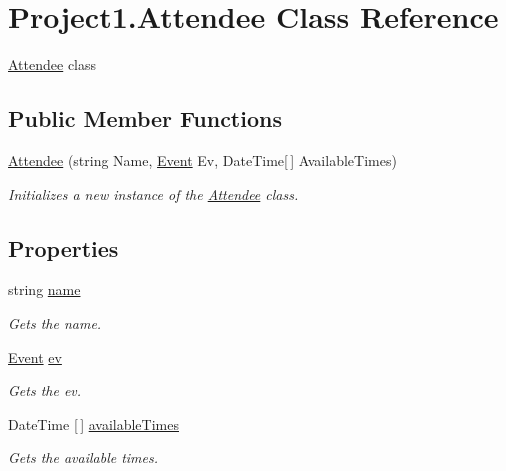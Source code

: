 \hypertarget{class_project1_1_1_attendee}{}\section{Project1.\+Attendee Class Reference}
\label{class_project1_1_1_attendee}


\hyperlink{class_project1_1_1_attendee}{Attendee} class  


\subsection*{Public Member Functions}
\begin{DoxyCompactItemize}
\item 
\hyperlink{class_project1_1_1_attendee_a63d1deb773834c121c3689a7d85265b9}{Attendee} (string Name, \hyperlink{class_project1_1_1_event}{Event} Ev, Date\+Time\mbox{[}$\,$\mbox{]} Available\+Times)
\begin{DoxyCompactList}\small\item\em Initializes a new instance of the \hyperlink{class_project1_1_1_attendee}{Attendee} class. \end{DoxyCompactList}\end{DoxyCompactItemize}
\subsection*{Properties}
\begin{DoxyCompactItemize}
\item 
string \hyperlink{class_project1_1_1_attendee_a5ccf26d80354941e9c4a80157b9fb6c9}{name}
\begin{DoxyCompactList}\small\item\em Gets the name. \end{DoxyCompactList}\item 
\hyperlink{class_project1_1_1_event}{Event} \hyperlink{class_project1_1_1_attendee_ad47df6573b4cb7b6dbd6ae35751abdc2}{ev}
\begin{DoxyCompactList}\small\item\em Gets the ev. \end{DoxyCompactList}\item 
Date\+Time \mbox{[}$\,$\mbox{]} \hyperlink{class_project1_1_1_attendee_a41af27c6b1dbd1aa8e2ad78870a956a0}{available\+Times}
\begin{DoxyCompactList}\small\item\em Gets the available times. \end{DoxyCompactList}\end{DoxyCompactItemize}


